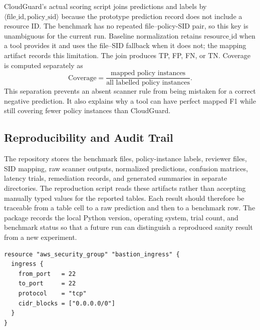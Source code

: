 \documentclass[conference]{IEEEtran}
\begin{document}
CloudGuard's actual scoring script joins predictions and labels by $\langle\text{file\_id},\text{policy\_sid}\rangle$ because the prototype prediction record does not include a resource ID. The benchmark has no repeated file--policy-SID pair, so this key is unambiguous for the current run. Baseline normalization retains $\text{resource\_id}$ when a tool provides it and uses the file--SID fallback when it does not; the mapping artifact records this limitation. The join produces TP, FP, FN, or TN. Coverage is computed separately as
\begin{equation}
\mathrm{Coverage}=\frac{\text{mapped policy instances}}{\text{all labelled policy instances}}.
\end{equation}
This separation prevents an absent scanner rule from being mistaken for a correct negative prediction. It also explains why a tool can have perfect mapped F1 while still covering fewer policy instances than CloudGuard.

\subsection{Reproducibility and Audit Trail}
The repository stores the benchmark files, policy-instance labels, reviewer files, SID mapping, raw scanner outputs, normalized predictions, confusion matrices, latency trials, remediation records, and generated summaries in separate directories. The reproduction script reads these artifacts rather than accepting manually typed values for the reported tables. Each result should therefore be traceable from a table cell to a raw prediction and then to a benchmark row. The package records the local Python version, operating system, trial count, and benchmark status so that a future run can distinguish a reproduced sanity result from a new experiment.

\begin{lstlisting}[caption={Example insecure Terraform ingress configuration.},label={lst:insecure}]
resource "aws_security_group" "bastion_ingress" {
  ingress {
    from_port   = 22
    to_port     = 22
    protocol    = "tcp"
    cidr_blocks = ["0.0.0.0/0"]
  }
}
\end{lstlisting}
\end{document}
